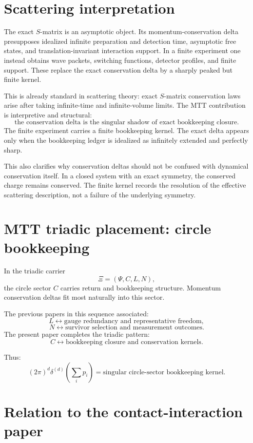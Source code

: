 \documentclass[11pt]{article}
\begin{document}
\section{Scattering interpretation}

The exact \(S\)-matrix is an asymptotic object.  Its momentum-conservation delta presupposes idealized infinite preparation and detection time, asymptotic free states, and translation-invariant interaction support.  In a finite experiment one instead obtains wave packets, switching functions, detector profiles, and finite support.  These replace the exact conservation delta by a sharply peaked but finite kernel.

This is already standard in scattering theory: exact \(S\)-matrix conservation laws arise after taking infinite-time and infinite-volume limits.  The MTT contribution is interpretive and structural:
\[
\boxed{
\text{the conservation delta is the singular shadow of exact bookkeeping closure.}
}
\]
The finite experiment carries a finite bookkeeping kernel.  The exact delta appears only when the bookkeeping ledger is idealized as infinitely extended and perfectly sharp.

This also clarifies why conservation deltas should not be confused with dynamical conservation itself.  In a closed system with an exact symmetry, the conserved charge remains conserved.  The finite kernel records the resolution of the effective scattering description, not a failure of the underlying symmetry.

\section{MTT triadic placement: circle bookkeeping}

In the triadic carrier
\[
\Xi=(\Psi,C,L,N),
\]
the circle sector \(C\) carries return and bookkeeping structure.  Momentum conservation deltas fit most naturally into this sector.

The previous papers in this sequence associated:
\[
L \longleftrightarrow \text{gauge redundancy and representative freedom},
\]
\[
N \longleftrightarrow \text{survivor selection and measurement outcomes}.
\]
The present paper completes the triadic pattern:
\[
C \longleftrightarrow \text{bookkeeping closure and conservation kernels}.
\]

Thus:
\[
\boxed{
(2\pi)^d\delta^{(d)}\!\left(\sum_i p_i\right)
=
\text{singular circle-sector bookkeeping kernel}.
}
\]

\section{Relation to the contact-interaction paper}
\end{document}
